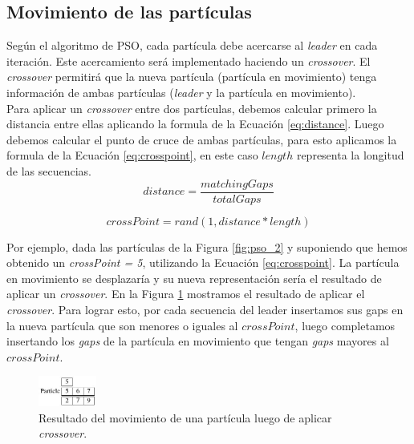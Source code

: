 \documentclass[conference]{IEEEtran}
\begin{document}
\subsection{Movimiento de las partículas}
Según el algoritmo de PSO, cada partícula debe acercarse al \textit{leader} en cada iteración. Este acercamiento será implementado haciendo un \textit{crossover}. El \textit{crossover} permitirá que la nueva partícula (partícula en movimiento) tenga información de ambas partículas (\textit{leader} y la partícula en movimiento).  \\

Para aplicar un \textit{crossover} entre dos partículas, debemos calcular primero la distancia entre ellas aplicando la formula de la Ecuación \ref{eq:distance}. Luego debemos calcular el punto de cruce de ambas partículas, para esto aplicamos la formula de la Ecuación \ref{eq:crosspoint}, en este caso $length$ representa la longitud de las secuencias.\\



\begin{equation}\label{eq:distance}
distance =  \dfrac{ matchingGaps }{totalGaps} 
\end{equation}

\begin{equation}\label{eq:crosspoint}
crossPoint =  rand( 1, distance*length )
\end{equation}

Por ejemplo, dada las partículas de la Figura \ref{fig:pso_2} y suponiendo que hemos obtenido un \textit{crossPoint = 5},  utilizando la Ecuación \ref{eq:crosspoint}. La partícula en movimiento se desplazaría y su nueva representación sería el resultado de aplicar un \textit{crossover}. En la Figura \ref{fig:pso_3} mostramos el resultado de aplicar el \textit{crossover}. Para lograr esto, por cada secuencia del leader insertamos sus gaps en la nueva partícula que son menores o iguales al $crossPoint$, luego completamos insertando los \textit{gaps} de la partícula en movimiento que tengan \textit{gaps} mayores al $crossPoint$.



\begin{figure}[h]
	\centering
	\includegraphics[width=0.17\textwidth]{images/pso_3}
	\caption{Resultado del movimiento de una partícula luego de aplicar \textit{crossover}.}
	\label{fig:pso_3}
\end{figure}
\end{document}

